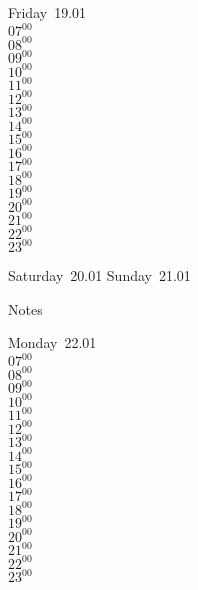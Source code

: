 \documentclass[11pt, a4paper]{book}\usepackage[]{graphicx}\usepackage[]{color}
\begin{document}
\begin{weekdaybox}
  Friday~19.01\\
  { 
  \vfill
  $07^{00}$\\
$08^{00}$\\
$09^{00}$\\
$10^{00}$\\
$11^{00}$\\
$12^{00}$\\
$13^{00}$\\
$14^{00}$\\
$15^{00}$\\
$16^{00}$\\
$17^{00}$\\
$18^{00}$\\
$19^{00}$\\
$20^{00}$\\
$21^{00}$\\
$22^{00}$\\
$23^{00}$\\
  }
\end{weekdaybox}
\begin{weekendbox}
  Saturday~20.01
  \tcblower
  Sunday~21.01
\end{weekendbox} %
\begin{notebox}
  Notes
\end{notebox}
\clearpage
\begin{headerbox}
\end{headerbox}
\begin{weekdaybox}
  Monday~22.01\\
  { 
  \vfill
  $07^{00}$\\
$08^{00}$\\
$09^{00}$\\
$10^{00}$\\
$11^{00}$\\
$12^{00}$\\
$13^{00}$\\
$14^{00}$\\
$15^{00}$\\
$16^{00}$\\
$17^{00}$\\
$18^{00}$\\
$19^{00}$\\
$20^{00}$\\
$21^{00}$\\
$22^{00}$\\
$23^{00}$\\
  }
\end{weekdaybox}
\end{document}
